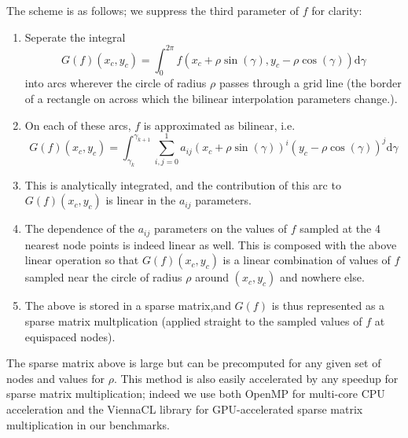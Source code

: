 \documentclass{article}
\theoremstyle{theorem}
\theoremstyle{definition}
\begin{document}
The scheme is as follows; we suppress the third parameter of $f$ for clarity:
\begin{enumerate}
	\item Seperate the integral
	\[ G(f)(x_c,y_c) = \int_0^{2\pi}  f(x_c + \rho \sin(\gamma), y_c - \rho \cos(\gamma))  \mathrm{d} \gamma\]
	into arcs wherever the circle of radius $\rho$ passes through a grid line (the border of a rectangle on across which the bilinear interpolation parameters change.).  
	\item On each of these arcs, $f$ is approximated as bilinear, i.e. 
	\[ G(f)(x_c,y_c) = \int_{\gamma_k}^{\gamma_{k+1}} \sum_{i,j=0}^{1} a_{ij} (x_c + \rho \sin(\gamma))^i (y_c - \rho \cos(\gamma))^j  \mathrm{d} \gamma\]
		\item This is analytically integrated, and the contribution of this arc to $G(f)(x_c,y_c)$ is linear in the $a_{ij}$ parameters.
	\item The dependence of the $a_{ij}$ parameters on the values of $f$ sampled at the 4 nearest node points is indeed linear as well.  This is composed with the above linear operation so that $G(f)(x_c,y_c)$ is a linear combination of values of $f$ sampled near the circle of radius $\rho$ around $(x_c,y_c)$ and nowhere else.
	\item  The above is stored in a sparse matrix,and $G(f)$ is thus represented as a sparse matrix multplication (applied straight to the sampled values of $f$ at equispaced nodes).
\end{enumerate}  
The sparse matrix above is large but can be precomputed for any given set of nodes and values for $\rho$.  This method is also easily accelerated by any speedup for sparse matrix multiplication; indeed we use both OpenMP for multi-core CPU acceleration and the ViennaCL library for GPU-accelerated sparse matrix multiplication in our benchmarks.
\end{document}
